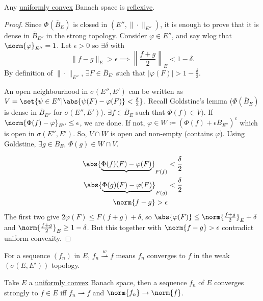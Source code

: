 \documentclass[twoside]{article}
\newcommand{\weakconv}{\overset{w}{\rightharpoonup}}
\begin{document}
\begin{thm}
    Any \hyperlink{def:uc}{uniformly convex} Banach space is \hyperlink{def:refl}{reflexive}.
\end{thm}
\begin{proof}
    Since $\Phi(\overline{B}_E)$ is closed in $(E'', \|\cdot\|_{E''})$, it is enough to prove that it is dense in $\overline{B}_{E''}$ in the strong topology.
    Consider $\varphi \in E''$, and say wlog that $\norm{\varphi}_{E''} = 1$. Let $\epsilon > 0$ so $\exists \delta$ with
    \begin{equation*}
        \|f - g\|_E > \epsilon \implies \left\|\frac{f+g}{2}\right\|_E < 1 - \delta.
    \end{equation*}
    By definition of $\|\cdot\|_{E''}$, $\exists F \in \overline{B}_{E'}$ such that $|\varphi(F)| > 1 - \frac{\delta}{2}$.

    An open neighbourhood in $\sigma(E'', E')$ can be written as $V = \set{\psi \in E'' | \abs{\psi(F) - \varphi(F)} < \frac{\delta}{2}}$.
    Recall Goldstine's lemma ($\Phi(\overline{B}_E)$ is dense in $\overline{B}_{E''}$ for $\sigma(E'', E')$).
    $\exists f \in \overline{B}_E$ such that $\Phi(f) \in V)$. If $\norm{\Phi(f) - \varphi}_{E''} \leq \epsilon$, we are done.
    If not, $\varphi \in W \coloneqq (\Phi(f) + \epsilon \overline{B}_{E''})^c$ which is open in $\sigma(E'', E')$.
    So, $V \cap W$ is open and non-empty (contains $\varphi$). Using Goldstine, $\exists g \in \overline{B}_E$, $\Phi(g) \in W \cap V$.

    \begin{align*}
        \abs{\underbrace{\Phi(f)(F) - \varphi(F)}}_{F(f)} &< \frac{\delta}{2} \\
        \abs{\underbrace{\Phi(g)(F) - \varphi(F)}}_{F(g)} &< \frac{\delta}{2} \\
        \norm{f-g} > \epsilon
    \end{align*}
    The first two give $2 \varphi(F) \leq F(f+g) + \delta$, so $\abs{\varphi(F)} \leq \norm{\frac{f+g}{2}}_E + \delta$ and $\norm{\frac{f+g}{2}}_E \geq 1 - \delta$.
    But this together with $\norm{f-g} > \epsilon$ contradict uniform convexity.
\end{proof}
\begin{notation}
    For a sequence $(f_n)$ in $E$, $f_n \weakconv f$ means $f_n$ converges to $f$ in the weak $(\sigma(E, E'))$ topology.
\end{notation}
\begin{prop}
    Take $E$ a \hyperlink{def:uc}{uniformly convex} Banach space, then a sequence $f_n$ of $E$ converges strongly to $f \in E$ iff $f_n \rightharpoonup f$ and $\norm{f_n} \to \norm{f}$.
\end{prop}
\end{document}
